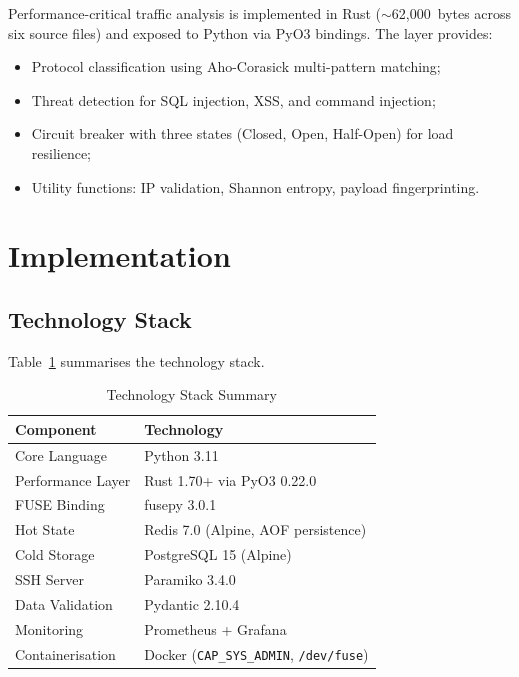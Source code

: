 \documentclass[conference]{IEEEtran}
\begin{document}
Performance-critical traffic analysis is implemented in Rust ($\sim$62{,}000~bytes across six source files) and exposed to Python via PyO3 bindings.
The layer provides:
\begin{itemize}[noitemsep]
  \item Protocol classification using Aho-Corasick multi-pattern matching;
  \item Threat detection for SQL injection, XSS, and command injection;
  \item Circuit breaker with three states (Closed, Open, Half-Open) for load resilience;
  \item Utility functions: IP validation, Shannon entropy, payload fingerprinting.
\end{itemize}

\section{Implementation}
\label{sec:implementation}

\subsection{Technology Stack}

Table~\ref{tab:techstack} summarises the technology stack.

\begin{table}[htbp]
\caption{Technology Stack Summary}
\label{tab:techstack}
\centering
\footnotesize
\begin{tabular}{@{}ll@{}}
\toprule
\textbf{Component} & \textbf{Technology} \\
\midrule
Core Language     & Python 3.11 \\
Performance Layer & Rust 1.70+ via PyO3 0.22.0 \\
FUSE Binding      & fusepy 3.0.1 \\
Hot State         & Redis 7.0 (Alpine, AOF persistence) \\
Cold Storage      & PostgreSQL 15 (Alpine) \\
SSH Server        & Paramiko 3.4.0 \\
Data Validation   & Pydantic 2.10.4 \\
Monitoring        & Prometheus + Grafana \\
Containerisation  & Docker (\texttt{CAP\_SYS\_ADMIN}, \texttt{/dev/fuse}) \\
\bottomrule
\end{tabular}
\end{table}
\end{document}
